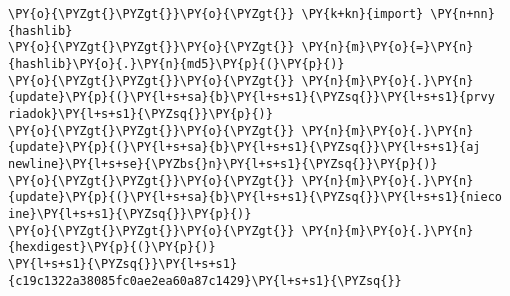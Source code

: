 \begin{Verbatim}[commandchars=\\\{\}]
\PY{o}{\PYZgt{}\PYZgt{}}\PY{o}{\PYZgt{}} \PY{k+kn}{import} \PY{n+nn}{hashlib}
\PY{o}{\PYZgt{}\PYZgt{}}\PY{o}{\PYZgt{}} \PY{n}{m}\PY{o}{=}\PY{n}{hashlib}\PY{o}{.}\PY{n}{md5}\PY{p}{(}\PY{p}{)}
\PY{o}{\PYZgt{}\PYZgt{}}\PY{o}{\PYZgt{}} \PY{n}{m}\PY{o}{.}\PY{n}{update}\PY{p}{(}\PY{l+s+sa}{b}\PY{l+s+s1}{\PYZsq{}}\PY{l+s+s1}{prvy riadok}\PY{l+s+s1}{\PYZsq{}}\PY{p}{)}
\PY{o}{\PYZgt{}\PYZgt{}}\PY{o}{\PYZgt{}} \PY{n}{m}\PY{o}{.}\PY{n}{update}\PY{p}{(}\PY{l+s+sa}{b}\PY{l+s+s1}{\PYZsq{}}\PY{l+s+s1}{aj newline}\PY{l+s+se}{\PYZbs{}n}\PY{l+s+s1}{\PYZsq{}}\PY{p}{)}
\PY{o}{\PYZgt{}\PYZgt{}}\PY{o}{\PYZgt{}} \PY{n}{m}\PY{o}{.}\PY{n}{update}\PY{p}{(}\PY{l+s+sa}{b}\PY{l+s+s1}{\PYZsq{}}\PY{l+s+s1}{nieco ine}\PY{l+s+s1}{\PYZsq{}}\PY{p}{)}
\PY{o}{\PYZgt{}\PYZgt{}}\PY{o}{\PYZgt{}} \PY{n}{m}\PY{o}{.}\PY{n}{hexdigest}\PY{p}{(}\PY{p}{)}
\PY{l+s+s1}{\PYZsq{}}\PY{l+s+s1}{c19c1322a38085fc0ae2ea60a87c1429}\PY{l+s+s1}{\PYZsq{}}
\end{Verbatim}
